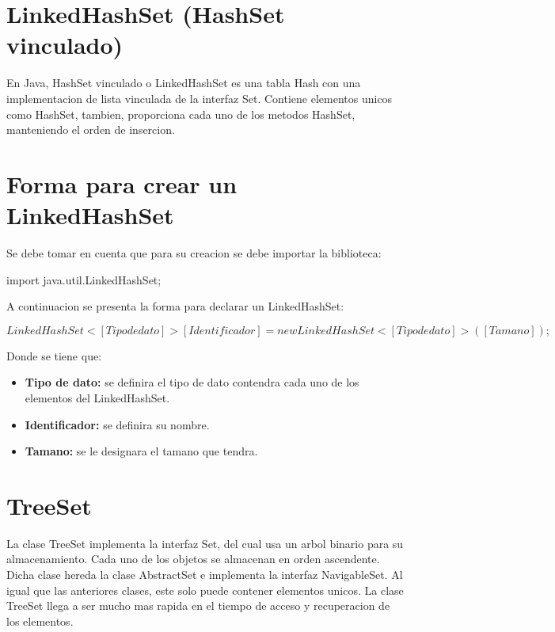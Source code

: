 \documentclass[12pt, letterpaper]{article} %
\begin{document}
\section*{LinkedHashSet (HashSet vinculado)}
En Java, HashSet vinculado o LinkedHashSet es una tabla Hash con una implementacion de lista vinculada de la interfaz Set. Contiene elementos unicos como HashSet, tambien, proporciona cada uno de los metodos HashSet, manteniendo el orden de insercion.

\section*{Forma para crear un LinkedHashSet}
Se debe tomar en cuenta que para su creacion se debe importar la biblioteca:
\begin{center}
    import java.util.LinkedHashSet;
\end{center}
A continuacion se presenta la forma para declarar un LinkedHashSet:
\begin{center}
    $LinkedHashSet<[Tipo de dato]> [Identificador] = new LinkedHashSet<[Tipo de dato]>([Tamano]);$
\end{center}
Donde se tiene que:
\begin{itemize}
    \item \textbf{Tipo de dato:} se definira el tipo de dato contendra cada uno de los elementos del LinkedHashSet.
    \item \textbf{Identificador:} se definira su nombre.
    \item \textbf{Tamano:} se le designara el tamano que tendra.
\end{itemize}

\section*{TreeSet}
La clase TreeSet implementa la interfaz Set, del cual usa un arbol binario para su almacenamiento. Cada uno de los objetos se almacenan en orden ascendente. Dicha clase hereda la clase AbstractSet e implementa la interfaz NavigableSet. Al igual que las anteriores clases, este solo puede contener elementos unicos. La clase TreeSet llega a ser mucho mas rapida en el tiempo de acceso y recuperacion de los elementos.
\end{document}
